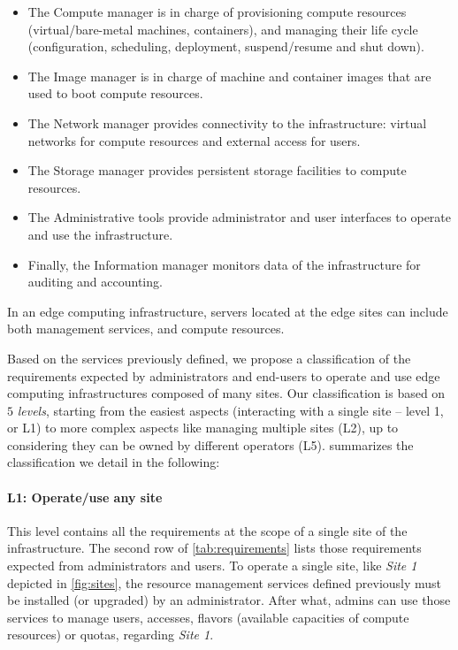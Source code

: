 \begin{itemize}
  \item The Compute manager is in charge of provisioning compute resources
    (\ie virtual/bare-metal machines, containers), and managing their life cycle
    (\eg configuration, scheduling, deployment, suspend/resume and shut down).
  \item The Image manager is in charge of machine and container images that are
    used to boot compute resources.
  \item The Network manager provides connectivity to the infrastructure:
    virtual networks for compute resources and external access for users.
  \item The Storage manager provides persistent storage facilities to
    compute resources.
  \item The Administrative tools provide administrator and user interfaces to
    operate and use the infrastructure.
  \item Finally, the Information manager monitors data of the infrastructure for
    auditing and accounting.
\end{itemize}

In an edge computing infrastructure, servers located at the edge sites can
include both management services, and compute resources.

Based on the services previously defined, we propose a classification of the
requirements expected by administrators and end-users to operate and use edge
computing infrastructures composed of many sites. Our classification is based
on $5$ \emph{levels}, starting from the easiest aspects (\ie interacting with
a single site -- level 1, or L1) to more complex aspects like managing multiple
sites (L2), up to considering they can be owned by different operators (L5).
 summarizes the classification we detail in the
following:

\paragraph{L1: Operate/use any site}
This level contains all the requirements at the scope of a single site of the
infrastructure. The second row of \cref{tab:requirements} lists those
requirements expected from administrators and users. To operate a single site,
like \emph{Site 1} depicted in \cref{fig:sites}, the resource management
services defined previously must be installed (or upgraded) by an
administrator. After what, admins can use those services to manage users,
accesses, flavors (\ie available capacities of compute resources) or quotas,
regarding \emph{Site 1}.

